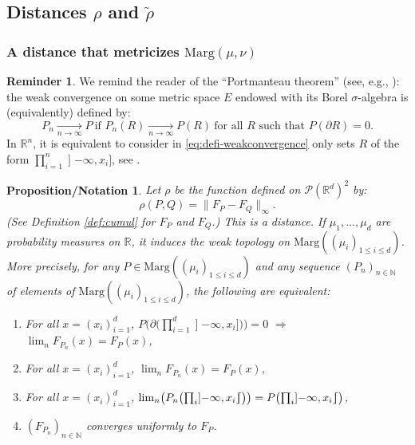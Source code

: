 \documentclass[10pt,a4paper]{article}
\providecommand{\Subsection}{\subsection}
\providecommand{\Subsubsection}{\subsubsection}
\renewcommand{\theenumi}{\alph{enumi}}
\renewcommand{\theenumii}{\roman{enumii}}
\newenvironment{enumeratei}
{\bgroup\def\theenumi{\roman{enumi}}\def\theenumii{\arabic{enumii}}\begin{enumerate}}
{\end{enumerate}\egroup}
\theoremstyle{plain}
\newtheorem{pronotation}[them]{Proposition/Notation}
\theoremstyle{definition}
\newtheorem{reminder}[them]{Reminder}
\newcommand{\p}{\mathcal{P}}
\newcommand{\ma}{\mathrm{Marg}}
\newcommand{\R}{\mathbb{R}}
\newcommand{\N}{\mathbb{N}}
\newcommand{\op}{\mathopen}
\newcommand{\clo}{\mathclose}
\newcommand{\rsemibracket}{\mathclose{\rfloor\hspace*{-.9ex}\lceil}}
\begin{document}
\Subsection{Distances $\rho$ and $\tilde \rho$}\label{subsec:rho}

\Subsubsection{A distance that metricizes $\ma(\mu,\nu)$}

\begin{reminder}\label{remind:billingsley}We remind the reader of the ``Portmanteau theorem'' (see, e.g., \cite[Th.\,2.1]{Bi}): the weak convergence on some metric space $E$ endowed with its Borel $\sigma$-algebra is (equivalently) defined by:
\begin{equation}\label{eq:defi-weakconvergence}P_n\underset{n\to\infty}{\longrightarrow}P\ \text{if }P_n(R)\underset{n\to\infty}{\longrightarrow}P(R)\ \text{for all $R$ such that }P(\partial R)=0.
\end{equation}
In $\R^n$, it is equivalent to consider in \eqref{eq:defi-weakconvergence} only sets $R$ of the form $\prod_{i=1}^n\op]-\infty,x_i\clo]$, see \cite[Exam.\,2.3 p.\,18]{Bi}.
\end{reminder}

\begin{pronotation}\label{pro:rho} Let $\rho$ be the function defined on $\p(\R^d)^2$ by:
\[\rho(P,Q)=\|F_P-F_Q\|_\infty.\]
(See Definition \ref{def:cumul} for $F_P$ and $F_Q$.) This is a distance. If $\mu_1,\ldots,\mu_d$ are probability measures on $\R$, it induces the weak topology on $\ma((\mu_i)_{1\leq i\leq d})$. More precisely, for any $P\in\ma((\mu_i)_{1\leq i\leq d})$ and any sequence $(P_n)_{n\in\N}$ of elements of $\ma((\mu_i)_{1\leq i\leq d})$, the following are equivalent:
\begin{enumeratei}
\item\label{pro:rhoi}
For all $x=(x_i)_{i=1}^d$, $P\bigl(\partial\bigl( \prod_{i=1}^d\op]-\infty,x_i\clo]\bigr)\bigr)=0$ $\Rightarrow$ $\lim_nF_{P_n}(x)=F_{P}(x)$,

\item\label{pro:rhoii}
For all $x=(x_i)_{i=1}^d$, $\lim_nF_{P_n}(x)=F_{P}(x)$,

\bgroup\renewcommand{\theenumi}{\roman{enumi}'}\setcounter{enumi}{1}
\item\label{pro:rhoii'}
For all $x=(x_i)_{i=1}^d$, $\lim_n\bigl(P_n\bigl(\prod_i\op]-\infty,x_i\rsemibracket\bigr)\bigr)=P\bigl(\prod_i\op]-\infty,x_i\rsemibracket\bigr)$,
\egroup

\item\label{pro:rhoiii}
$(F_{P_n})_{n\in \N}$ converges uniformly to $F_P$.
\end{enumeratei}
\end{pronotation}
\end{document}
